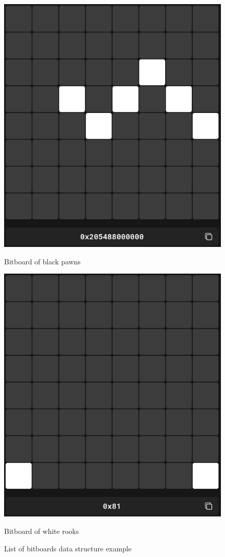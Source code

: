 \begin{figure}[H]
\begin{minipage}[c]{0.30\textwidth}
        \includegraphics[width=\textwidth]{Imagenes/bitboard_black_pawns.png}
        \caption*{Bitboard of black pawns}
    \end{minipage}
    \hfill
    \begin{minipage}[c]{0.30\textwidth}
        \includegraphics[width=\textwidth]{Imagenes/bitboard_white_rooks.png}
        \caption*{Bitboard of white rooks}
    \end{minipage}
    \caption{List of bitboards data structure example}\label{fig:bitboardPositionExample}
\end{figure}

